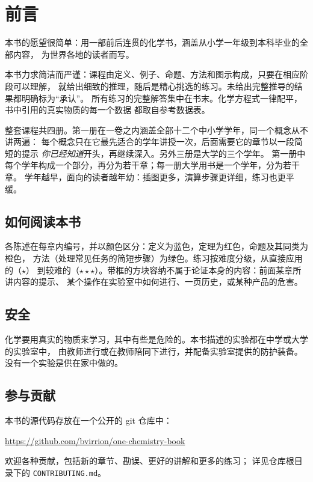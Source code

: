 \chapter{前言}

本书的愿望很简单：用一部前后连贯的化学书，涵盖从小学一年级到本科毕业的全部内容，
为世界各地的读者而写。

本书力求简洁而严谨：课程由定义、例子、命题、方法和图示构成，只要在相应阶段可以理解，
就给出细致的推理，随后是精心挑选的练习。未给出完整推导的结果都明确标为“承认”。
所有练习的完整解答集中在书末。化学方程式一律配平，书中引用的真实物质的每一个数据
都取自参考数据表。

整套课程共四册。第一册在一卷之内涵盖全部十二个中小学学年，同一个概念从不讲两遍：
每个概念只在它最先适合的学年讲授一次，后面需要它的章节以一段简短的提示
\emph{你已经知道}开头，再继续深入。另外三册是大学的三个学年。
第一册中每个学年构成一个部分，再分为若干章；每一册大学用书是一个学年，分为若干章。
学年越早，面向的读者越年幼：插图更多，演算步骤更详细，练习也更平缓。

\section*{如何阅读本书}

各陈述在每章内编号，并以颜色区分：定义为蓝色，定理为红色，命题及其同类为橙色，
方法（处理常见任务的简短步骤）为绿色。练习按难度分级，从直接应用的（$\star$）
到较难的（$\star\star\star$）。带框的方块容纳不属于论证本身的内容：前面某章所讲内容的提示、
某个操作在实验室中如何进行、一页历史，或某种产品的危害。

\section*{安全}

化学要用真实的物质来学习，其中有些是危险的。本书描述的实验都在中学或大学的实验室中，
由教师进行或在教师陪同下进行，并配备实验室提供的防护装备。没有一个实验是供在家中做的。

\section*{参与贡献}

本书的源代码存放在一个公开的 git 仓库中：
\begin{center}
\url{https://github.com/bvirrion/one-chemistry-book}
\end{center}
欢迎各种贡献，包括新的章节、勘误、更好的讲解和更多的练习；
详见仓库根目录下的 \texttt{CONTRIBUTING.md}。
